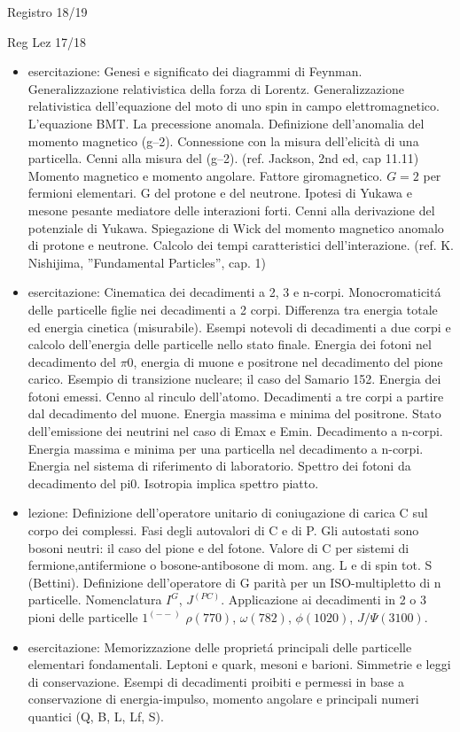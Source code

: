 \begin{frame}{Registro 18/19}
\begin{frame}[allowframebreaks]{Reg Lez 17/18}
\begin{itemize}
\item esercitazione: Genesi e significato dei diagrammi di Feynman. Generalizzazione relativistica della forza di Lorentz. Generalizzazione relativistica dell'equazione del moto di uno spin in campo elettromagnetico. L'equazione BMT. La precessione anomala. Definizione dell'anomalia del momento magnetico (g–2). Connessione con la misura dell'elicità di una particella. Cenni alla misura del (g–2). (ref. Jackson, 2nd ed, cap 11.11) Momento magnetico e momento angolare. Fattore giromagnetico. $G=2$ per fermioni elementari. G del protone e del neutrone. Ipotesi di Yukawa e mesone pesante mediatore delle interazioni forti. Cenni alla derivazione del potenziale di Yukawa. Spiegazione di Wick del momento magnetico anomalo di protone e neutrone. Calcolo dei tempi caratteristici dell'interazione. (ref. K. Nishijima, ''Fundamental Particles'', cap. 1)

\item esercitazione: Cinematica dei decadimenti a 2, 3 e n-corpi. Monocromaticit\'a delle particelle figlie nei decadimenti a 2 corpi. Differenza tra energia totale ed energia cinetica (misurabile). Esempi notevoli di decadimenti a due corpi e calcolo dell'energia delle particelle nello stato finale. Energia dei fotoni nel decadimento del $\pi0$, energia di muone e positrone nel decadimento del pione carico. Esempio di transizione nucleare; il caso del Samario 152. Energia dei fotoni emessi. Cenno al rinculo dell'atomo. Decadimenti a tre corpi a partire dal decadimento del muone. Energia massima e minima del positrone. Stato dell'emissione dei neutrini nel caso di Emax e Emin. Decadimento a n-corpi. Energia massima e minima per una particella nel decadimento a n-corpi. Energia nel sistema di riferimento di laboratorio. Spettro dei fotoni da decadimento del pi0. Isotropia implica spettro piatto.

\item lezione: Definizione dell'operatore unitario di coniugazione di carica C sul corpo dei complessi. Fasi degli autovalori di C e di P. Gli autostati sono bosoni neutri: il caso del pione e del fotone. Valore di C per sistemi di fermione,antifermione o bosone-antibosone di mom. ang. L e di spin tot. S (Bettini). Definizione dell'operatore di G parità per un ISO-multipletto di n particelle. Nomenclatura $I^G$, $J^{(PC)}$. Applicazione ai decadimenti in 2 o 3 pioni delle particelle $1^{(--)}$ $\rho(770)$, $\omega(782)$, $\phi(1020)$, $J/\Psi(3100)$.

\item esercitazione: Memorizzazione delle propriet\'a principali delle particelle elementari fondamentali. Leptoni e quark, mesoni e barioni. Simmetrie e leggi di conservazione. Esempi di decadimenti proibiti e permessi in base a conservazione di energia-impulso, momento angolare e principali numeri quantici (Q, B, L, Lf, S).


\end{itemize}
\end{frame}
\end{frame}
